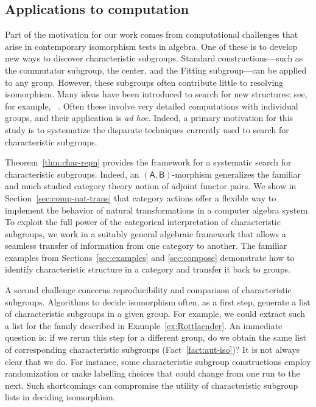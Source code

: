 \documentclass{amsart}
\newcommand{\acat}[1]{\mathsf{#1}}
\numberwithin{lstfloat}{section}
\theoremstyle{definition}
\theoremstyle{remark}
\numberwithin{equation}{section}
\begin{document}
\subsection{Applications to computation}
\label{sec:apps_type}
Part of the motivation for our work comes from computational challenges that
arise in contemporary isomorphism tests in algebra. 
One of these is to develop new ways to discover characteristic subgroups. 
Standard constructions---such as the commutator subgroup, 
the center, and the Fitting subgroup---can be applied to any group.  
However, these subgroups often contribute little to resolving isomorphism.
Many ideas have been introduced to search for   
new structures; see, for example, 
~. 
Often these involve very detailed computations with 
individual groups, and 
their application 
is {\it ad hoc}. Indeed, a primary motivation for 
this study is to systematize the disparate techniques 
currently used to search for characteristic subgroups.

Theorem~\ref{thm:char-repn} provides the framework for a systematic search for
characteristic subgroups. Indeed, an $(\acat{A},\acat{B})$-morphism generalizes
the familiar and much studied category theory notion of adjoint functor pairs.
We show in Section~\ref{sec:comp-nat-trans} that category actions offer a
flexible way to implement the behavior of natural transformations in a computer
algebra system. To exploit the full power of the categorical interpretation of
characteristic subgroups, we work in a suitably general algebraic framework that
allows a seamless transfer of information from one category to another. The
familiar examples from Sections~\ref{sec:examples} and \ref{sec:compose} demonstrate how to
identify characteristic structure in a category and transfer it back to groups.

A second challenge concerns reproducibility and comparison of characteristic
subgroups. Algorithms to decide isomorphism often, as a first step, generate a
list of characteristic subgroups in a given group. For example, we could extract
such a list for the family described in Example~\ref{ex:Rottlaender}. An
immediate question is: if we rerun this step for a different group, do we obtain
the same list of  corresponding characteristic subgroups (Fact~\ref{fact:aut-iso})?
It is not always clear that we do. For instance, some 
characteristic subgroup constructions 
employ randomization
or make labelling choices that could change from one run to the next. Such
shortcomings can compromise the utility of characteristic subgroup lists in
deciding isomorphism.
\end{document}
